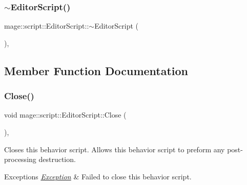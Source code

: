 \hypertarget{classmage_1_1script_1_1_editor_script_a1454bd68e4111691b6e287966dfd252a}{}\label{classmage_1_1script_1_1_editor_script_a1454bd68e4111691b6e287966dfd252a} 
\subsubsection{\texorpdfstring{$\sim$\+Editor\+Script()}{~EditorScript()}}
{\footnotesize\ttfamily mage\+::script\+::\+Editor\+Script\+::$\sim$\+Editor\+Script (\begin{DoxyParamCaption}{ }\end{DoxyParamCaption})\hspace{0.3cm}{\ttfamily [virtual]}, {\ttfamily [default]}}



\subsection{Member Function Documentation}
\hypertarget{classmage_1_1script_1_1_editor_script_af6093dd776e3822045f452515662463e}{}\label{classmage_1_1script_1_1_editor_script_af6093dd776e3822045f452515662463e} 
\subsubsection{\texorpdfstring{Close()}{Close()}}
{\footnotesize\ttfamily void mage\+::script\+::\+Editor\+Script\+::\+Close (\begin{DoxyParamCaption}{ }\end{DoxyParamCaption})\hspace{0.3cm}{\ttfamily [override]}, {\ttfamily [virtual]}}

Closes this behavior script. Allows this behavior script to preform any post-\/processing destruction.


\begin{DoxyExceptions}{Exceptions}
{\em \hyperlink{classmage_1_1_exception}{Exception}} & Failed to close this behavior script. \\
\hline
\end{DoxyExceptions}



